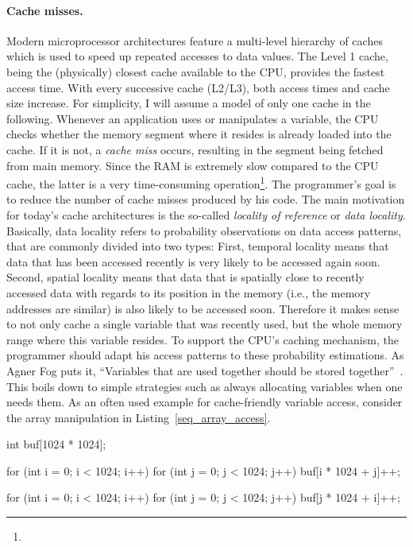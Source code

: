 \paragraph{Cache misses.} Modern microprocessor architectures feature a multi-level hierarchy of caches which is used to speed up repeated accesses to data values. The Level 1 cache, being the (physically) closest cache available to the CPU, provides the fastest access time. With every successive cache (L2/L3), both access times and cache size increase. For simplicity, I will assume a model of only one cache in the following. Whenever an application uses or manipulates a variable, the CPU checks whether the memory segment where it resides is already loaded into the cache. If it is not, a \emph{cache miss} occurs, resulting in the segment being fetched from main memory. Since the RAM is extremely slow compared to the CPU cache, the latter is a very time-consuming operation\footnote{}. The programmer's goal is to reduce the number of cache misses produced by his code. The main motivation for today's cache architectures is the so-called \emph{locality of reference} or \emph{data locality}. Basically, data locality refers to probability observations on data access patterns, that are commonly divided into two types: First, temporal locality means that data that has been accessed recently is very likely to be accessed again soon. Second, spatial locality means that data that is spatially close to recently accessed data with regards to its position in the memory (i.e., the memory addresses are similar) is also likely to be accessed soon. Therefore it makes sense to not only cache a single variable that was recently used, but the whole memory range where this variable resides. To support the CPU's caching mechanism, the programmer should adapt his access patterns to these probability estimations. As Agner Fog puts it, ``Variables that are used together should be stored together''~\cite[p. 88]{fog2011optimizing}. This boils down to simple strategies such as always allocating variables when one needs them. As an often used example for cache-friendly variable access, consider the array manipulation in Listing~\ref{seq_array_access}.
\begin{code}[caption={Sequential vs. non-sequential array access}, label=seq_array_access]
int buf[1024 * 1024];

for (int i = 0; i < 1024; i++)
  for (int j = 0; j < 1024; j++)
    buf[i * 1024 + j]++;

for (int i = 0; i < 1024; i++)
  for (int j = 0; j < 1024; j++)
    buf[j * 1024 + i]++;
\end{code}

